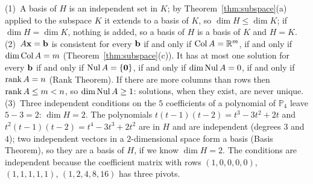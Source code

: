 \documentclass[11pt]{article}
\begin{document}
\begin{description}[leftmargin=0pt,itemsep=5pt]
  \item[Questions to think about.] (1)~A basis of $H$ is an independent set in $K$; by Theorem~\ref{thm:subspace}(a) applied to the subspace $K$ it extends to a basis of $K$, so $\dim H\le\dim K$; if $\dim H=\dim K$, nothing is added, so a basis of $H$ is a basis of $K$ and $H=K$. (2)~$A\mathbf{x}=\mathbf{b}$ is consistent for every $\mathbf{b}$ if and only if $\operatorname{Col} A=\mathbb{R}^m$, if and only if $\dim\operatorname{Col} A=m$ (Theorem~\ref{thm:subspace}(c)). It has at most one solution for every $\mathbf{b}$ if and only if $\operatorname{Nul} A=\{\mathbf{0}\}$, if and only if $\dim\operatorname{Nul} A=0$, if and only if $\operatorname{rank} A=n$ (Rank Theorem). If there are more columns than rows then $\operatorname{rank} A\le m<n$, so $\dim\operatorname{Nul} A\ge1$: solutions, when they exist, are never unique. (3)~Three independent conditions on the $5$ coefficients of a polynomial of $\mathbb{P}_4$ leave $5-3=2$: $\dim H=2$. The polynomials $t(t-1)(t-2)=t^3-3t^2+2t$ and $t^2(t-1)(t-2)=t^4-3t^3+2t^2$ are in $H$ and are independent (degrees $3$ and $4$); two independent vectors in a $2$-dimensional space form a basis (Basis Theorem), so they are a basis of $H$, if we know $\dim H=2$. The conditions are independent because the coefficient matrix with rows $(1,0,0,0,0)$, $(1,1,1,1,1)$, $(1,2,4,8,16)$ has three pivots.
\end{description}
\end{document}
